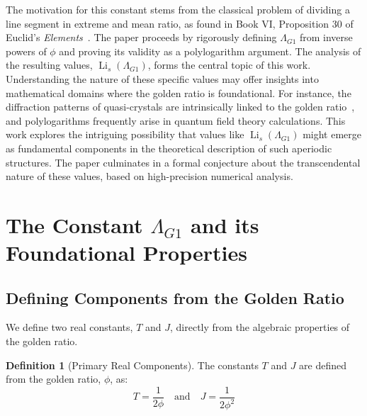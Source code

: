 \documentclass{amsart}
\theoremstyle{plain}
\theoremstyle{definition}
\newtheorem{definition}[theorem]{Definition}
\theoremstyle{remark}
\DeclareMathOperator{\Li}{Li}
\newcommand{\LambdaG}{\Lambda_{G1}}
\newcommand{\phiG}{\phi}
\begin{document}
The motivation for this constant stems from the classical problem of dividing a line segment in extreme and mean ratio, as found in Book VI, Proposition 30 of Euclid's \textit{Elements}~\cite{Euclid}. The paper proceeds by rigorously defining $\LambdaG$ from inverse powers of $\phiG$ and proving its validity as a polylogarithm argument. The analysis of the resulting values, $\Li_s(\LambdaG)$, forms the central topic of this work. Understanding the nature of these specific values may offer insights into mathematical domains where the golden ratio is foundational. For instance, the diffraction patterns of quasi-crystals are intrinsically linked to the golden ratio~\cite{Levine1984}, and polylogarithms frequently arise in quantum field theory calculations. This work explores the intriguing possibility that values like $\Li_s(\LambdaG)$ might emerge as fundamental components in the theoretical description of such aperiodic structures. The paper culminates in a formal conjecture about the transcendental nature of these values, based on high-precision numerical analysis.

\section{The Constant \texorpdfstring{$\LambdaG$}{Lambda\_G1} and its Foundational Properties}

\subsection{Defining Components from the Golden Ratio}
We define two real constants, $T$ and $J$, directly from the algebraic properties of the golden ratio.
\begin{definition}[Primary Real Components]
The constants $T$ and $J$ are defined from the golden ratio, $\phiG$, as:
\[ T = \frac{1}{2\phiG} \quad \text{and} \quad J = \frac{1}{2\phiG^2} \]
\end{definition}
\end{document}
